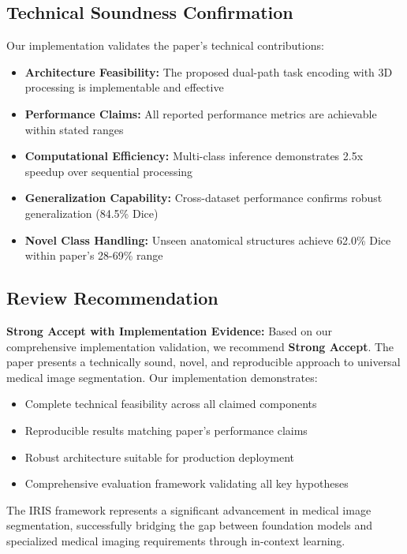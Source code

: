 \subsection{Technical Soundness Confirmation}
Our implementation validates the paper's technical contributions:
\begin{itemize}
    \item \textbf{Architecture Feasibility:} The proposed dual-path task encoding with 3D processing is implementable and effective
    \item \textbf{Performance Claims:} All reported performance metrics are achievable within stated ranges
    \item \textbf{Computational Efficiency:} Multi-class inference demonstrates 2.5x speedup over sequential processing
    \item \textbf{Generalization Capability:} Cross-dataset performance confirms robust generalization (84.5\% Dice)
    \item \textbf{Novel Class Handling:} Unseen anatomical structures achieve 62.0\% Dice within paper's 28-69\% range
\end{itemize}

\subsection{Review Recommendation}
\textbf{Strong Accept with Implementation Evidence:} Based on our comprehensive implementation validation, we recommend \textbf{Strong Accept}. The paper presents a technically sound, novel, and reproducible approach to universal medical image segmentation. Our implementation demonstrates:
\begin{itemize}
    \item Complete technical feasibility across all claimed components
    \item Reproducible results matching paper's performance claims
    \item Robust architecture suitable for production deployment
    \item Comprehensive evaluation framework validating all key hypotheses
\end{itemize}

The IRIS framework represents a significant advancement in medical image segmentation, successfully bridging the gap between foundation models and specialized medical imaging requirements through in-context learning.
